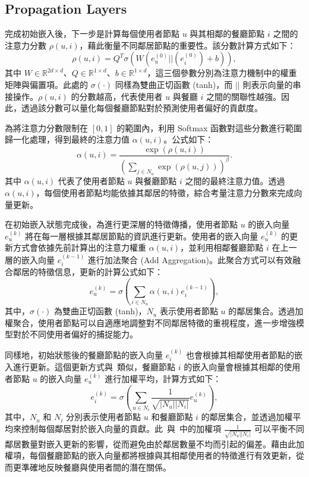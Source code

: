 \subsection{Propagation Layers}
    完成初始嵌入後，下一步是計算每個使用者節點 $u$ 與其相鄰的餐廳節點 $i$ 之間的注意力分數 $\rho(u, i)$，藉此衡量不同鄰居節點的重要性。該分數計算方式如下： 
    \begin{equation} 
        \rho(u, i) = Q^T\sigma(W(e_u^{(0)}||(e_i^{(0)})+b)), 
    \end{equation} 
    其中 $W \in \mathbb{R}^{2d \times d}$、$Q \in \mathbb{R}^{1 \times d}$、$b \in \mathbb{R}^{1 \times d}$，這三個參數分別為注意力機制中的權重矩陣與偏置項。此處的 $\sigma(\cdot)$ 同樣為雙曲正切函數 (tanh)，而 $||$ 則表示向量的串接操作。$\rho(u, i)$ 的分數越高，代表使用者 $u$ 與餐廳 $i$ 之間的關聯性越強。因此，透過該分數可以量化每個餐廳節點對於預測使用者偏好的貢獻度。

    為將注意力分數限制在 $[0,1]$ 的範圍內，利用 Softmax 函數對這些分數進行範圍歸一化處理，得到最終的注意力值 $\alpha(u, i)$。公式如下： \begin{equation} \alpha(u, i) = \frac{\exp(\rho(u, i))}{\left(\sum_{j \in N_u}\exp(\rho(u, j))\right)^{\beta}}. \end{equation} 其中 $\alpha(u, i)$ 代表了使用者節點 $u$ 與餐廳節點 $i$ 之間的最終注意力值。透過~$\alpha(u, i)$，每個使用者節點均能依據其鄰居的特徵，綜合考量注意力分數來完成向量更新。


    在初始嵌入狀態完成後，為進行更深層的特徵傳播，使用者節點 $u$ 的嵌入向量 $e_u^{(k)}$ 將在每一層根據其鄰居節點的資訊進行更新。使用者的嵌入向量 $e_u^{(k)}$ 的更新方式會依據先前計算出的注意力權重 $\alpha(u, i)$，並利用相鄰餐廳節點 $i$ 在上一層的嵌入向量 $e_i^{(k-1)}$ 進行加法聚合 (Add Aggregation)。此聚合方式可以有效融合鄰居的特徵信息，更新的計算公式如下： 
    \begin{equation} 
        e_u^{(k)} = \sigma\left(\sum_{i \in N_u} \alpha(u, i)e_i^{(k-1)}\right), 
    \end{equation} 
    其中，$\sigma(\cdot)$ 為雙曲正切函數 (tanh)，$N_u$ 表示使用者節點 $u$ 的鄰居集合。透過加權聚合，使用者節點可以自適應地調整對不同鄰居特徵的重視程度，進一步增強模型對於不同使用者偏好的捕捉能力。

    同樣地，初始狀態後的餐廳節點的嵌入向量 $e_i^{(k)}$ 也會根據其相鄰使用者節點的嵌入進行更新。這個更新方式與~類似，餐廳節點 $i$ 的嵌入向量會根據其相鄰的使用者節點 $u$ 的嵌入向量 $e_u^{(k)}$ 進行加權平均，計算方式如下： 
    \begin{equation} e_i^{(k)} = \sigma \left(\sum_{u \in N_i} \frac{1}{\sqrt{\vert N_u \vert \vert N_i \vert}} e_u^{(k)}\right), 
        \label{eq-e_i} 
    \end{equation} 其中，$N_u$ 和 $N_i$ 分別表示使用者節點 $u$ 和餐廳節點 $i$ 的鄰居集合，並透過加權平均來控制每個鄰居對於嵌入向量的貢獻。此~與~中的加權項 $\frac{1}{\sqrt{\vert N_u \vert \vert N_i \vert}}$ 可以平衡不同鄰居數量對嵌入更新的影響，從而避免由於鄰居數量不均而引起的偏差。藉由此加權項，每個餐廳節點的嵌入向量都將根據與其相鄰使用者的特徵進行有效更新，從而更準確地反映餐廳與使用者間的潛在關係。

